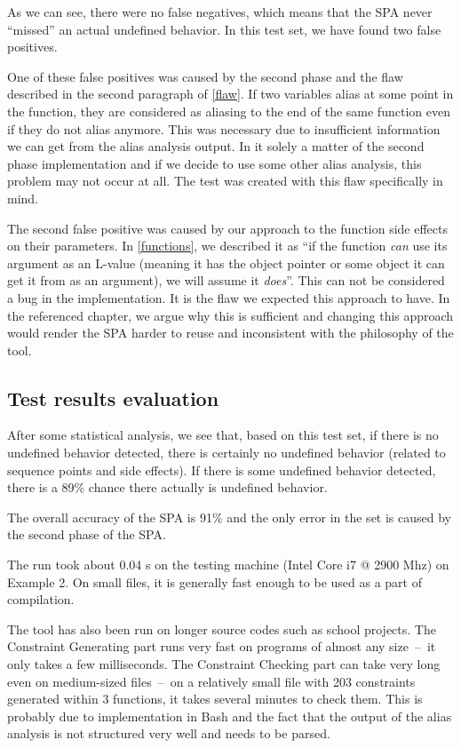 As we can see, there were no false negatives, which means that the SPA never ``missed'' an actual undefined behavior. In this test set, we have found two false positives.

One of these false positives was caused by the second phase and the flaw described in the second paragraph of \ref{flaw}. If two variables alias at some point in the function, they are considered as aliasing to the end of the same function even if they do not alias anymore. This was necessary due to insufficient information we can get from the alias analysis output. In it solely a matter of the second phase implementation and if we decide to use some other alias analysis, this problem may not occur at all. The test was created with this flaw specifically in mind. %

The second false positive was caused by our approach to the function side effects on their parameters. In \ref{functions}, we described it as ``if the function \emph{can} use its argument as an L-value (meaning it has the object pointer or some object it can get it from as an argument), we will assume it \emph{does}''. This can not be considered a bug in the implementation. It is the flaw we expected this approach to have. In the referenced chapter, we argue why this is sufficient and changing this approach would render the SPA harder to reuse and inconsistent with the philosophy of the tool.

\subsection{Test results evaluation}

After some statistical analysis, we see that, based on this test set, if there is no undefined behavior detected, there is certainly no undefined behavior (related to sequence points and side effects). If there is some undefined behavior detected, there is a 89\% chance there actually is undefined behavior.

The overall accuracy of the SPA is 91\% and the only error in the set is caused by the second phase of the SPA.

The run took about 0.04 s on the testing machine (Intel Core i7 @ 2900 Mhz) on Example 2. On small files, it is generally fast enough to be used as a part of compilation.

The tool has also been run on longer source codes such as school projects. The Constraint Generating part runs very fast on programs of almost any size~--~it only takes a few milliseconds. The Constraint Checking part can take very long even on medium-sized files~--~on a relatively small file with 203 constraints generated within 3 functions, it takes several minutes to check them. This is probably due to implementation in Bash and the fact that the output of the alias analysis is not structured very well and needs to be parsed.

